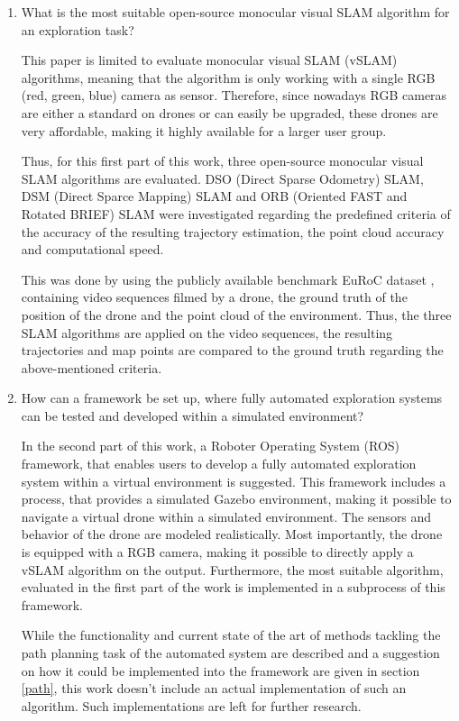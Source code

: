  \begin{enumerate}
 \item{What is the most suitable open-source monocular visual SLAM algorithm for an exploration task?}
 
 
  This paper is limited to evaluate monocular visual SLAM (vSLAM) algorithms, meaning that the algorithm is only working
 with a single RGB (red, green, blue) camera as sensor. Therefore, since nowadays RGB cameras are either a standard on drones or can easily be upgraded,
 these drones are very affordable, making it highly available for a larger user group. 
 
 
 Thus, for this first part of this work, three open-source monocular visual SLAM algorithms are evaluated. 
  DSO (Direct Sparse Odometry) SLAM, DSM (Direct Sparce Mapping) SLAM and ORB (Oriented FAST and Rotated BRIEF)
 SLAM were investigated regarding the predefined criteria of the accuracy of the resulting trajectory estimation, the point cloud accuracy and computational speed. 
 
 This was done by using the publicly available benchmark EuRoC dataset \cite{euroc}, containing video sequences filmed by a drone, the 
 ground truth of the position of the drone and the point cloud of the environment. Thus, the three SLAM algorithms are applied on the 
 video sequences, the resulting trajectories and map points are compared to the ground truth regarding the above-mentioned criteria.

 \item{How can a framework be set up, where fully automated exploration systems can be tested and developed within a simulated environment?}
 
 
 In the second part of this work, a Roboter Operating System (ROS) framework, that enables users to develop a fully automated exploration system within 
 a virtual environment is suggested. This framework includes a process, that provides a simulated Gazebo environment, making it possible to navigate 
 a virtual drone within a simulated environment. The sensors and behavior of the drone are modeled realistically. Most importantly, the drone is equipped with a RGB 
 camera, making it possible to directly apply a vSLAM algorithm on the output. 
 Furthermore, the most suitable algorithm, evaluated in the first part of the work is implemented in a subprocess of this framework. 
 
 While the functionality and current state of the art of methods tackling the path planning task of the automated system are described and a suggestion on how it could 
 be implemented into the framework are given in section \ref{path}, this work doesn't include an actual implementation of such an algorithm. 
 Such implementations are left for further research. 
 

\end{enumerate}
